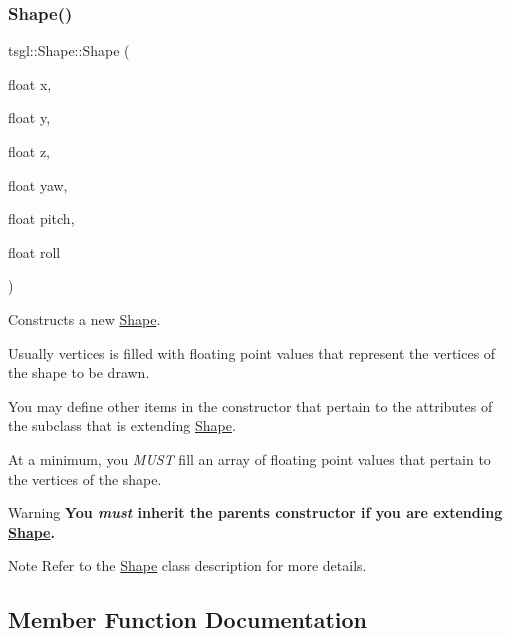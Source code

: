 \subsubsection{\texorpdfstring{Shape()}{Shape()}}
{\footnotesize\ttfamily tsgl\+::\+Shape\+::\+Shape (\begin{DoxyParamCaption}\item[{float}]{x,  }\item[{float}]{y,  }\item[{float}]{z,  }\item[{float}]{yaw,  }\item[{float}]{pitch,  }\item[{float}]{roll }\end{DoxyParamCaption})}



Constructs a new \hyperlink{classtsgl_1_1_shape}{Shape}. 


\begin{DoxyItemize}
\item Usually {\ttfamily vertices} is filled with floating point values that represent the vertices of the shape to be drawn.
\item You may define other items in the constructor that pertain to the attributes of the subclass that is extending \hyperlink{classtsgl_1_1_shape}{Shape}.
\item At a minimum, you {\itshape M\+U\+ST} fill an array of floating point values that pertain to the vertices of the shape. \begin{DoxyWarning}{Warning}
{\bfseries You {\itshape must} inherit the parent\textquotesingle{}s constructor if you are extending \hyperlink{classtsgl_1_1_shape}{Shape}.} 
\end{DoxyWarning}
\begin{DoxyNote}{Note}
Refer to the \hyperlink{classtsgl_1_1_shape}{Shape} class description for more details. 
\end{DoxyNote}

\end{DoxyItemize}

\subsection{Member Function Documentation}
\mbox{\label{classtsgl_1_1_shape_aeb780a6a509ccceae2323508745cd8fd}} 
